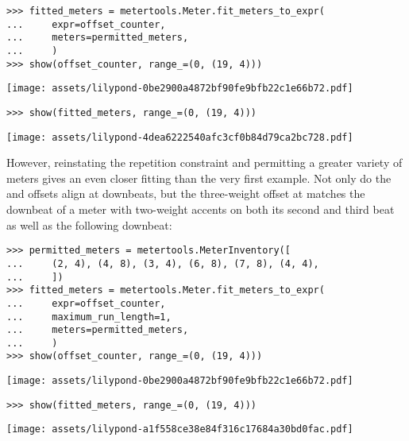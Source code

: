 \begin{abjadbookoutput}
\begin{singlespacing}
\vspace{-0.5\baselineskip}
\begin{verbatim}
>>> fitted_meters = metertools.Meter.fit_meters_to_expr(
...     expr=offset_counter,
...     meters=permitted_meters,
...     )
>>> show(offset_counter, range_=(0, (19, 4)))
\end{verbatim}
\noindent\texttt{[image: assets/lilypond-0be2900a4872bf90fe9bfb22c1e66b72.pdf]}
\begin{verbatim}
>>> show(fitted_meters, range_=(0, (19, 4)))
\end{verbatim}
\noindent\texttt{[image: assets/lilypond-4dea6222540afc3cf0b84d79ca2bc728.pdf]}
\end{singlespacing}
\end{abjadbookoutput}

\noindent However, reinstating the repetition constraint and permitting a
greater variety of meters gives an even closer fitting than the very first
example. Not only do the  and  offsets align at
downbeats, but the three-weight offset at  matches the downbeat of
a  meter with two-weight accents on both its second and third beat
as well as the following downbeat:

\begin{comment}
<abjad>
permitted_meters = metertools.MeterInventory([
    (2, 4), (4, 8), (3, 4), (6, 8), (7, 8), (4, 4),
    ])
fitted_meters = metertools.Meter.fit_meters_to_expr(
    expr=offset_counter,
    maximum_run_length=1,
    meters=permitted_meters,
    )
show(offset_counter, range_=(0, (19, 4)))
show(fitted_meters, range_=(0, (19, 4)))
</abjad>
\end{comment}

\begin{abjadbookoutput}
\begin{singlespacing}
\vspace{-0.5\baselineskip}
\begin{verbatim}
>>> permitted_meters = metertools.MeterInventory([
...     (2, 4), (4, 8), (3, 4), (6, 8), (7, 8), (4, 4),
...     ])
>>> fitted_meters = metertools.Meter.fit_meters_to_expr(
...     expr=offset_counter,
...     maximum_run_length=1,
...     meters=permitted_meters,
...     )
>>> show(offset_counter, range_=(0, (19, 4)))
\end{verbatim}
\noindent\texttt{[image: assets/lilypond-0be2900a4872bf90fe9bfb22c1e66b72.pdf]}
\begin{verbatim}
>>> show(fitted_meters, range_=(0, (19, 4)))
\end{verbatim}
\noindent\texttt{[image: assets/lilypond-a1f558ce38e84f316c17684a30bd0fac.pdf]}
\end{singlespacing}
\end{abjadbookoutput}

